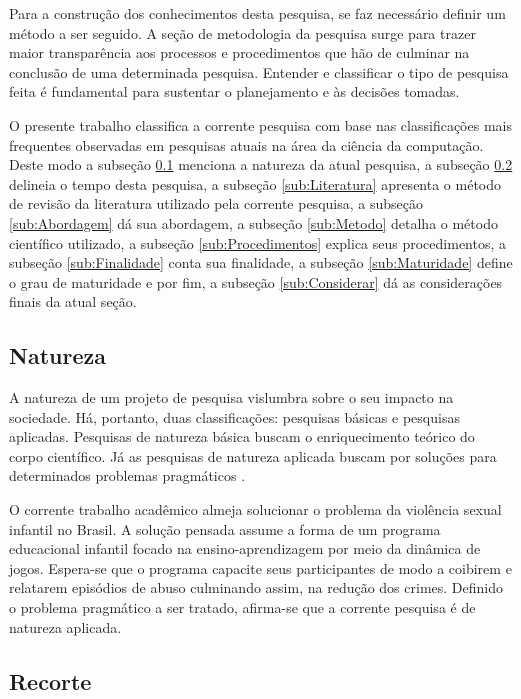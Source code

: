 Para a construção dos conhecimentos desta pesquisa, se faz necessário definir um método a ser seguido. A seção de metodologia da pesquisa surge para trazer maior transparência aos processos e procedimentos que hão de culminar na conclusão de uma determinada pesquisa. Entender e classificar o tipo de pesquisa feita é fundamental para sustentar o planejamento e às decisões tomadas.

O presente trabalho classifica a corrente pesquisa com base nas classificações mais frequentes observadas em pesquisas atuais na área da ciência da computação. Deste modo a subseção \ref{sub:Natureza} menciona a natureza da atual pesquisa, a subseção \ref{sub:Recorte} delineia o tempo desta pesquisa, a subseção \ref{sub:Literatura} apresenta o método de revisão da literatura utilizado pela corrente pesquisa, a subseção \ref{sub:Abordagem} dá sua abordagem, a subseção \ref{sub:Metodo} detalha o método científico utilizado, a subseção \ref{sub:Procedimentos} explica seus procedimentos, a subseção \ref{sub:Finalidade} conta sua finalidade, a subseção \ref{sub:Maturidade} define o grau de maturidade e por fim, a subseção \ref{sub:Considerar} dá as considerações finais da atual seção. 


\subsection{Natureza}\label{sub:Natureza}

A natureza de um projeto de pesquisa vislumbra sobre o seu impacto na sociedade. Há, portanto, duas classificações: pesquisas básicas e pesquisas aplicadas. Pesquisas de natureza básica buscam o enriquecimento teórico do corpo científico. Já as pesquisas de natureza aplicada buscam por soluções para determinados problemas pragmáticos \cite{zanella2006metodologia}.

O corrente trabalho acadêmico almeja solucionar o problema da violência sexual infantil no Brasil. A solução pensada assume a forma de um programa educacional infantil focado na ensino-aprendizagem por meio da dinâmica de jogos. Espera-se que o programa capacite seus participantes de modo a coibirem e relatarem episódios de abuso culminando assim, na redução dos crimes. Definido o problema pragmático a ser tratado, afirma-se que a corrente pesquisa é de natureza aplicada.

\subsection{Recorte}\label{sub:Recorte}

